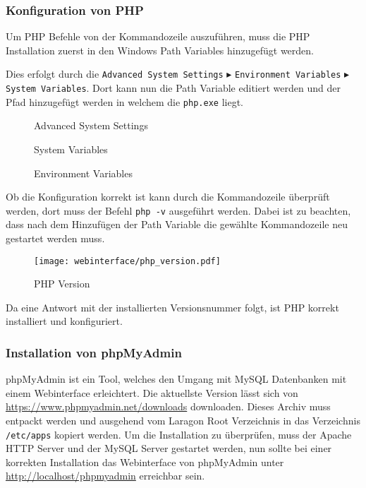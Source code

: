 \subsubsection{Konfiguration von PHP}
Um PHP Befehle von der Kommandozeile auszuführen, muss die PHP Installation zuerst in
den Windows Path Variables hinzugefügt werden.

Dies erfolgt durch die \verb|Advanced System Settings| $\blacktriangleright$
\verb|Environment Variables| $\blacktriangleright$ \verb|System Variables|. Dort
kann nun die Path Variable editiert werden und der Pfad hinzugefügt werden in
welchem die \verb|php.exe| liegt.

\begin{figure}[H]
  \centering
  \caption{Advanced System Settings}
\end{figure}

\begin{figure}[H]
  \centering
  \caption{System Variables}
\end{figure}

\begin{figure}[H]
  \centering
  \caption{Environment Variables}
\end{figure}

Ob die Konfiguration korrekt ist kann durch die Kommandozeile überprüft werden, dort
muss der Befehl \verb|php -v| ausgeführt werden. Dabei ist zu beachten, dass
nach dem Hinzufügen der Path Variable die gewählte Kommandozeile neu gestartet
werden muss.

\begin{figure}[H]
  \centering
  \texttt{[image: webinterface/php\_version.pdf]}
  \caption{PHP Version}
\end{figure}

Da eine Antwort mit der installierten Versionsnummer folgt, ist PHP korrekt
installiert und konfiguriert.

\subsubsection{Installation von phpMyAdmin}
phpMyAdmin ist ein Tool, welches den Umgang mit MySQL Datenbanken mit einem
Webinterface erleichtert. Die aktuellste Version lässt sich von
\url{https://www.phpmyadmin.net/downloads} downloaden. Dieses Archiv muss
entpackt werden und ausgehend vom Laragon Root Verzeichnis in das Verzeichnis
\verb|/etc/apps| kopiert werden. Um die Installation zu überprüfen, muss der
Apache HTTP Server und der MySQL Server gestartet werden, nun sollte bei einer
korrekten Installation das Webinterface von phpMyAdmin unter
\url{http://localhost/phpmyadmin} erreichbar sein.

